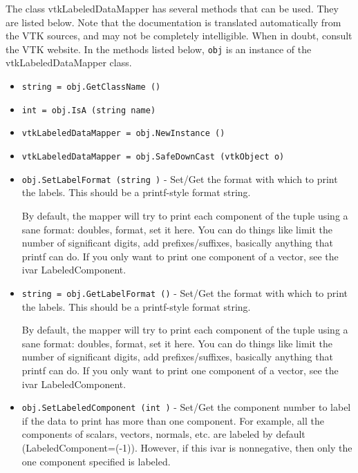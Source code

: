 The class vtkLabeledDataMapper has several methods that can be used.
  They are listed below.
Note that the documentation is translated automatically from the VTK sources,
and may not be completely intelligible.  When in doubt, consult the VTK website.
In the methods listed below, \verb|obj| is an instance of the vtkLabeledDataMapper class.
\begin{itemize}
\item  \verb|string = obj.GetClassName ()|

\item  \verb|int = obj.IsA (string name)|

\item  \verb|vtkLabeledDataMapper = obj.NewInstance ()|

\item  \verb|vtkLabeledDataMapper = obj.SafeDownCast (vtkObject o)|

\item  \verb|obj.SetLabelFormat (string )| -  Set/Get the format with which to print the labels.  This should
 be a printf-style format string.

 By default, the mapper will try to print each component of the
 tuple using a sane format: %
 doubles, %
 format, set it here.  You can do things like limit the number of
 significant digits, add prefixes/suffixes, basically anything
 that printf can do.  If you only want to print one component of a
 vector, see the ivar LabeledComponent.

\item  \verb|string = obj.GetLabelFormat ()| -  Set/Get the format with which to print the labels.  This should
 be a printf-style format string.

 By default, the mapper will try to print each component of the
 tuple using a sane format: %
 doubles, %
 format, set it here.  You can do things like limit the number of
 significant digits, add prefixes/suffixes, basically anything
 that printf can do.  If you only want to print one component of a
 vector, see the ivar LabeledComponent.

\item  \verb|obj.SetLabeledComponent (int )| -  Set/Get the component number to label if the data to print has
 more than one component. For example, all the components of
 scalars, vectors, normals, etc. are labeled by default
 (LabeledComponent=(-1)). However, if this ivar is nonnegative,
 then only the one component specified is labeled.


\end{itemize}
